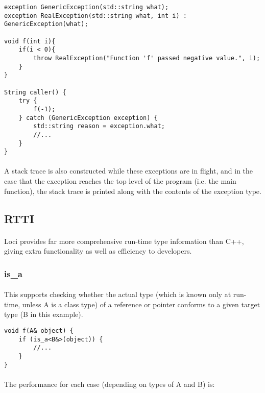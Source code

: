 \documentclass[12pt,twoside,notitlepage]{report}
\begin{document}
\begin{lstlisting}
exception GenericException(std::string what);
exception RealException(std::string what, int i) : GenericException(what);

void f(int i){
	if(i < 0){
		throw RealException("Function 'f' passed negative value.", i);
	}
}

String caller() {
	try {
		f(-1);
	} catch (GenericException exception) {
		std::string reason = exception.what;
		//...
	}
}
\end{lstlisting}

\paragraph{}
A stack trace is also constructed while these exceptions are in flight, and in the case that the exception reaches the top level of the program (i.e. the main function), the stack trace is printed along with the contents of the exception type.

\clearpage

\subsection{RTTI}

\paragraph{}
Loci provides far more comprehensive run-time type information than C++, giving extra functionality as well as efficiency to developers.

\subsubsection{is\_a}

\paragraph{}
This supports checking whether the actual type (which is known only at run-time, unless A is a class type) of a reference or pointer conforms to a given target type (B in this example).

\begin{lstlisting}
void f(A& object) {
	if (is_a<B&>(object)) {
		//...
	}
}
\end{lstlisting}

\paragraph{}
The performance for each case (depending on types of A and B) is:
\end{document}
